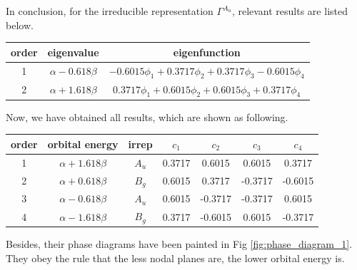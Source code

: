 \documentclass[a4paper]{book}
\newcommand\Figref[1]{Fig \ref{#1}}
\begin{document}
\begin{solution}
\begin{enumerate}[label=(\alph*)]
		In conclusion, for the irreducible representation $\Gamma^{A_u}$, relevant results are listed below.
		
		\begin{center}
		\setlength{\abovecaptionskip}{-0.5em}
		\begin{tabular}{ccc}\hline
		  order	&	eigenvalue		& 	eigenfunction	\\ \hline
			1	&$\alpha-0.618\beta$& 	$-0.6015 \phi_1 + 0.3717 \phi_2 + 0.3717 \phi_3 - 0.6015 \phi_4$ \\
			2	&$\alpha+1.618\beta$& 	$0.3717\phi_1 + 0.6015 \phi_2 +0.6015 \phi_3 + 0.3717\phi_4$  \\	 \hline
		\end{tabular}
		\end{center}
		
		Now, we have obtained all results, which are shown as following.
		
		\begin{center}
		\setlength{\abovecaptionskip}{-0.5em}
		\begin{tabular}{ccccccc}\hline
		order 	& orbital energy & irrep & $c_1$ & $c_2$ & $c_3$ &$c_4$ \\ \hline
			1	&	$\alpha+1.618\beta$	&	$A_u$	&	0.3717	&	0.6015	&	0.6015	&	0.3717	\\
			2	&	$\alpha+0.618\beta$	&	$B_g$	&	0.6015	&	0.3717	&	-0.3717	&	-0.6015	\\
			3	&	$\alpha-0.618\beta$	&	$A_u$	&	0.6015	&	-0.3717	&	-0.3717	&	0.6015	\\
			4	&	$\alpha-1.618\beta$	&	$B_g$	&	0.3717	&	-0.6015	&	0.6015	&	-0.3717	\\ \hline
		\end{tabular}
		\end{center}
		
		Besides, their phase diagrams have been painted in \Figref{fig:phase_diagram_1}. They obey the rule that the less nodal planes are, the lower orbital energy is.
		

\end{enumerate}
\end{solution}
\end{document}
